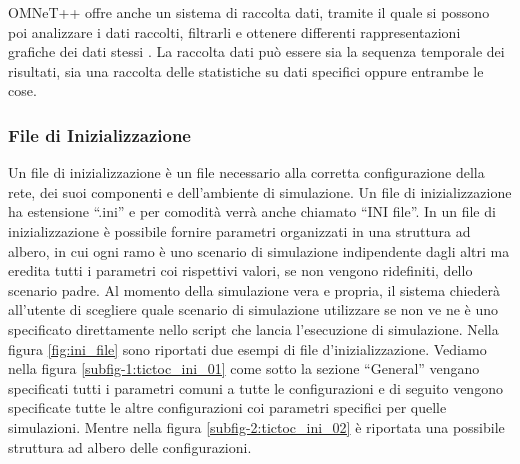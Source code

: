 OMNeT++ offre anche un sistema di raccolta dati, tramite il quale si possono poi analizzare i dati raccolti, filtrarli e ottenere differenti rappresentazioni grafiche dei dati stessi \cite{omnet2002-overview}. La raccolta dati può essere sia la sequenza temporale dei risultati, sia una raccolta delle statistiche su dati specifici oppure entrambe le cose.
 \bigskip
 
\subsubsection{File di Inizializzazione}
Un file di inizializzazione è un file necessario alla corretta configurazione della rete, dei suoi componenti e dell'ambiente di simulazione. Un file di inizializzazione ha estensione “.ini” e per comodità verrà anche chiamato “INI file”. In un file di inizializzazione è possibile fornire parametri organizzati in una struttura ad albero, in cui ogni ramo  è uno scenario di simulazione indipendente dagli altri ma eredita tutti i parametri coi rispettivi valori, se non vengono ridefiniti, dello scenario padre. Al momento della simulazione vera e propria, il sistema chiederà all'utente di scegliere quale scenario di simulazione utilizzare se non ve ne è uno specificato direttamente nello script che lancia l'esecuzione di simulazione. 
Nella figura \ref{fig:ini_file} sono riportati due esempi di file d'inizializzazione. Vediamo nella figura \ref{subfig-1:tictoc_ini_01} come sotto la sezione “General” vengano specificati tutti i parametri comuni a tutte le configurazioni e di seguito vengono specificate tutte le altre configurazioni coi parametri specifici per quelle simulazioni. Mentre nella figura \ref{subfig-2:tictoc_ini_02} è riportata una possibile struttura ad albero delle configurazioni.

